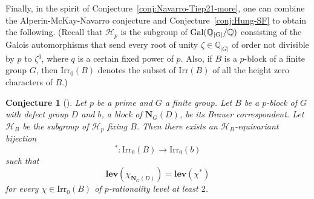 \documentclass[12pt]{amsart}
\newtheorem{conjecture}[theorem]{Conjecture}
\theoremstyle{definition}
\numberwithin{equation}{section}
\newcommand{\Irr}{{\mathrm {Irr}}}
\newcommand{\Gal}{{\rm Gal}}
\newcommand{\QQ}{{\mathbb Q}}
\newcommand{\lev}{\mathrm{\mathbf{lev}}}
\newcommand{\bN}{{\mathbf{N}}}
\begin{document}
Finally, in the spirit of Conjecture~\ref{conj:Navarro-Tiep21-more},
one can combine the Alperin-McKay-Navarro conjecture and
Conjecture~\ref{conj:Hung-SF} to obtain the following. (Recall that
$\mathcal{H}_p$ is the subgroup of $\Gal(\QQ_{|G|}/\QQ)$ consisting
of the Galois automorphisms that send every root of unity
$\zeta\in\QQ_{|G|}$ of order not divisible by $p$ to $\zeta^{q}$,
where $q$ is a certain fixed power of $p$. Also, if $B$ is a
$p$-block of a finite group $G$, then $\Irr_0(B)$ denotes the subset
of $\Irr(B)$ of all the height zero characters of $B$.)


\begin{conjecture}[\cite{HS25}]
Let $p$ be a prime and $G$ a finite group. Let $B$ be a $p$-block of
$G$ with defect group $D$ and $b$, a block of $\bN_G(D)$, be its
Brauer correspondent. Let $\mathcal{H}_B$ be the subgroup of
$\mathcal{H}_p$ fixing $B$. Then there exists an
$\mathcal{H}_B$-equivariant bijection \[^*: \Irr_0(B) \rightarrow
\Irr_0(b)\] such that \[\lev(\chi_{\bN_G(D)})=\lev(\chi^\ast)\] for
every $\chi\in\Irr_0(B)$ of $p$-rationality level at least $2$.
\end{conjecture}

\end{document}
